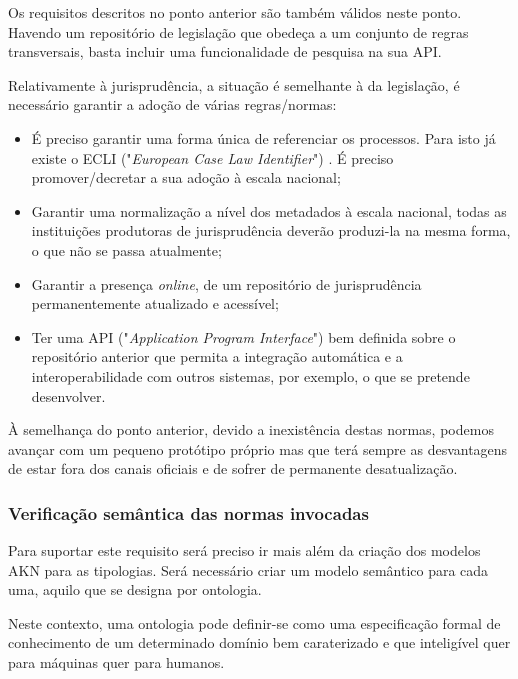 Os requisitos descritos no ponto anterior são também válidos neste ponto.
Havendo um repositório de legislação que obedeça a um conjunto de regras transversais, basta incluir uma funcionalidade de 
pesquisa na sua API.

Relativamente à jurisprudência, a situação é semelhante à da legislação, é necessário garantir a adoção de várias regras/normas:

\begin{itemize}
    \item É preciso garantir uma forma única de referenciar os processos. Para isto já existe o ECLI 
    ("\emph{European Case Law Identifier}") \cite{ECLI}. É preciso promover/decretar a sua adoção à escala nacional; 

    \item Garantir uma normalização a nível dos metadados à escala nacional, todas as instituições produtoras de 
   jurisprudência deverão produzi-la na mesma forma, o que não se passa atualmente;

    \item Garantir a presença \emph{online}, de um repositório de jurisprudência permanentemente atualizado e acessível;

    \item Ter uma API ("\emph{Application Program Interface}") bem definida sobre o repositório anterior que permita a 
    integração automática e a interoperabilidade com outros sistemas, por exemplo, o que se pretende desenvolver.
\end{itemize}

À semelhança do ponto anterior, devido a inexistência destas normas, podemos avançar com um pequeno protótipo próprio mas que terá sempre as desvantagens de 
estar fora dos canais oficiais e de sofrer de permanente desatualização.

\subsubsection{Verificação semântica das normas invocadas}

Para suportar este requisito será preciso ir mais além da criação dos modelos AKN para as tipologias.
Será necessário criar um modelo semântico para cada uma, aquilo que se designa por ontologia.

Neste contexto, uma ontologia pode definir-se como uma especificação formal de conhecimento de um determinado domínio bem 
caraterizado e que inteligível quer para máquinas quer para humanos.


